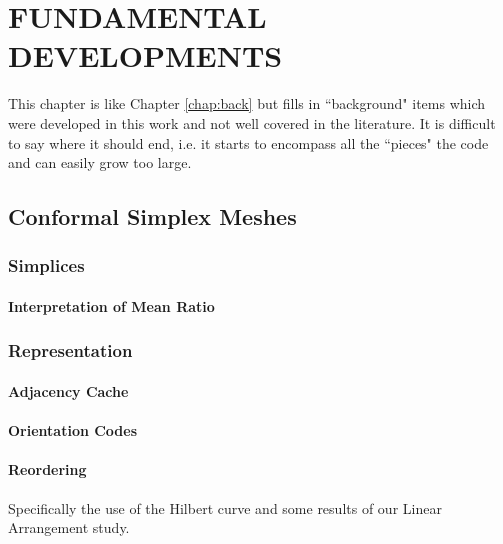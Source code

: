 
\chapter{FUNDAMENTAL DEVELOPMENTS}

This chapter is like Chapter \ref{chap:back} but
fills in ``background" items which were developed in
this work and not well covered in the literature.
It is difficult to say where it should end, i.e.
it starts to encompass all the ``pieces" the code
and can easily grow too large.

\section{Conformal Simplex Meshes}

\subsection{Simplices}

\subsubsection{Interpretation of Mean Ratio}

\subsection{Representation}

\subsubsection{Adjacency Cache}

\subsubsection{Orientation Codes}

\subsubsection{Reordering}

Specifically the use of the Hilbert curve
and some results of our Linear Arrangement study.

